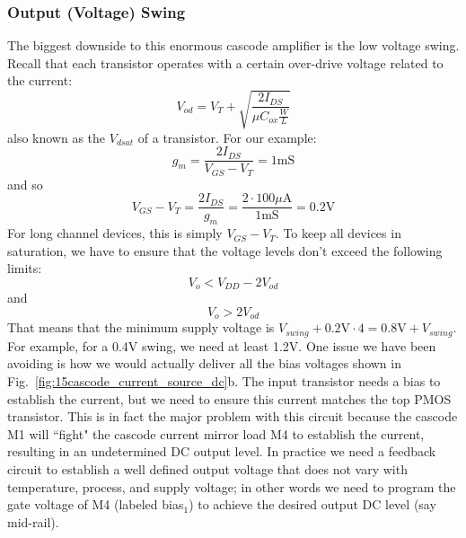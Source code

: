 \subsubsection{Output (Voltage) Swing}
The biggest downside to this enormous cascode amplifier is the low voltage swing.  Recall that each transistor operates with a certain over-drive voltage related to the current:
    \begin{equation}
        V_{od} = V_T + \sqrt{\frac{2 I_{DS}}{\mu C_{ox} \frac{W}{L}}} 
    \end{equation}
also known as the $V_{dsat}$ of a transistor.  For our example:
    \begin{equation} 
        {g_m} = \frac{{2{I_{DS}}}}{{{V_{GS}} - {V_T}}} = 1\mathrm{mS} 
    \end{equation}
and so
    \begin{equation}
        {V_{GS}} - {V_T} = \frac{{2{I_{DS}}}}{{{g_m}}} = \frac{{2 \cdot100\mu \mathrm{A}}}{{1\mathrm{mS}}} = 0.2\mathrm{V} 
    \end{equation}
For long channel devices, this is simply $V_{GS} - V_T$.  To keep all devices in saturation, we have to ensure that the voltage levels don't exceed the following limits:
    \begin{equation}
        V_{o} < V_{DD} - 2 V_{od}
    \end{equation} 
and
    \begin{equation}
        V_{o} >  2 V_{od}
    \end{equation} 
That means that the minimum supply voltage is $V_{swing} + 0.2\mathrm{V} \cdot 4 = 0.8\mathrm{V} + V_{swing}$.  For example, for a 0.4V swing, we need at least 1.2V.  
One issue we have been avoiding is how we would actually deliver all the bias voltages shown in Fig.~\ref{fig:15cascode_current_source_dc}b.  The input transistor needs a bias to establish the current, but we need to ensure this current matches the top PMOS transistor.  This is in fact the major problem with this circuit because the cascode M1 will ``fight" the cascode current mirror load M4 to establish the current, resulting in an undetermined DC output level.  In practice we need a feedback circuit to establish a well defined output voltage that does not vary with temperature, process, and supply voltage; in other words we need to program the gate voltage of M4 (labeled bias$_1$) to achieve the desired output DC level (say mid-rail).
